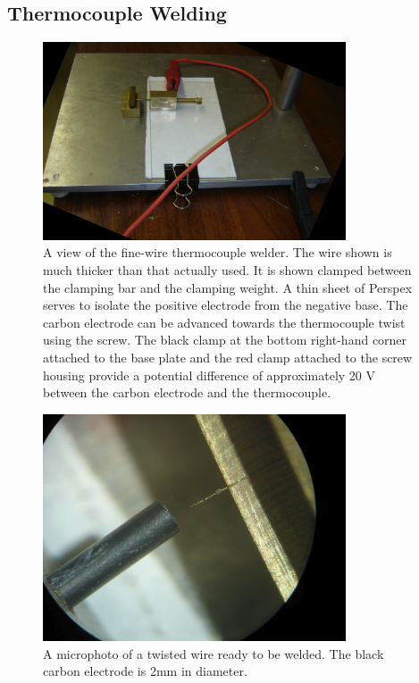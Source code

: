 \subsection{Thermocouple Welding}

\begin{figure}
	\centering
	\includegraphics[width=0.8\textwidth,natwidth=4.17in,natheight=3.32in]{Figures/Welder2.jpg}
	\decoRule

\caption[Fine-wire welder]{A view of the fine-wire thermocouple welder. The wire
shown is much thicker than that actually used. It is shown clamped between the
clamping bar and the clamping weight. A thin sheet of Perspex serves to isolate
the positive electrode from the negative base. The carbon electrode can be
advanced towards the thermocouple twist using the screw. The black clamp at the
bottom right-hand corner attached to the base plate and the red clamp attached
to the screw housing provide a potential difference of approximately 20 V
between the carbon electrode and the thermocouple.}


\label{fig:FireWireWelder}
\end{figure}



\begin{figure}
	\centering
	\includegraphics[width=0.8\textwidth,natwidth=4.17in,natheight=3.32in]{./Figures/WelderMicro.jpg}
	\decoRule
	
\caption[A microphoto of a thermocouple twist ready to be welded.]{A microphoto
of a twisted wire ready to be welded. The black carbon electrode is 2mm in
diameter.}
	
	\label{fig:TheFigureLabel}
\end{figure}


